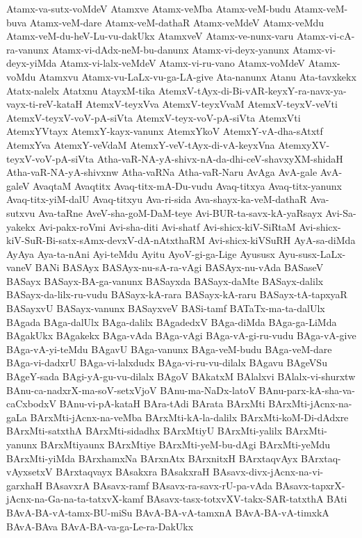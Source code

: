 {Atamx-va-sutx-voMdeV
Atamxve
Atamx-veMba
Atamx-veM-budu
Atamx-veM-buva
Atamx-veM-dare
Atamx-veM-dathaR
Atamx-veMdeV
Atamx-veMdu
Atamx-veM-du-heV-Lu-vu-dakUkx
AtamxveV
Atamx-ve-nunx-varu
Atamx-vi-cA-ra-vanunx
Atamx-vi-dAdx-neM-bu-danunx
Atamx-vi-deyx-yanunx
Atamx-vi-deyx-yiMda
Atamx-vi-lalx-veMdeV
Atamx-vi-ru-vano
Atamx-voMdeV
Atamx-voMdu
Atamxvu
Atamx-vu-LaLx-vu-ga-LA-give
Ata-nanunx
Atanu
Ata-tavxkekx
Atatx-nalelx
Atatxnu
AtayxM-tika
AtemxV-tAyx-di-Bi-vAR-keyxY-ra-navx-ya-vayx-ti-reV-kataH
AtemxV-teyxVva
AtemxV-teyxVvaM
AtemxV-teyxV-veVti
AtemxV-teyxV-voV-pA-siVta
AtemxV-teyx-voV-pA-siVta
AtemxVti
AtemxYVtayx
AtemxY-kayx-vanunx
AtemxYkoV
AtemxY-vA-dha-sAtxtf
AtemxYva
AtemxY-veVdaM
AtemxY-veV-tAyx-di-vA-keyxVna
AtemxyXV-teyxV-voV-pA-siVta
Atha-vaR-NA-yA-shivx-nA-da-dhi-ceV-shavxyXM-shidaH
Atha-vaR-NA-yA-shivxnw
Atha-vaRNa
Atha-vaR-Naru
AvAga
AvA-gale
AvA-galeV
AvaqtaM
Avaqtitx
Avaq-titx-mA-Du-vudu
Avaq-titxya
Avaq-titx-yanunx
Avaq-titx-yiM-dalU
Avaq-titxyu
Ava-ri-sida
Ava-shayx-ka-veM-dathaR
Ava-sutxvu
Ava-taRne
AveV-sha-goM-DaM-teye
Avi-BUR-ta-savx-kA-yaRsayx
Avi-Sa-yakekx
Avi-pakx-roVmi
Avi-sha-diti
Avi-shatf
Avi-shicx-kiV-SiRtaM
Avi-shicx-kiV-SuR-Bi-satx-sAmx-devxV-dA-nAtxthaRM
Avi-shicx-kiVSuRH
AyA-sa-diMda
AyAya
Aya-ta-nAni
Ayi-teMdu
Ayitu
AyoV-gi-ga-Lige
Ayususx
Ayu-susx-LaLx-vaneV
BANi
BASAyx
BASAyx-nu-sA-ra-vAgi
BASAyx-nu-vAda
BASaseV
BASayx
BASayx-BA-ga-vanunx
BASayxda
BASayx-daMte
BASayx-dalilx
BASayx-da-lilx-ru-vudu
BASayx-kA-rara
BASayx-kA-raru
BASayx-tA-tapxyaR
BASayxvU
BASayx-vanunx
BASayxveV
BASi-tamf
BATaTx-ma-ta-dalUlx
BAgada
BAga-dalUlx
BAga-dalilx
BAgadedxV
BAga-diMda
BAga-ga-LiMda
BAgakUkx
BAgakekx
BAga-vAda
BAga-vAgi
BAga-vA-gi-ru-vudu
BAga-vA-give
BAga-vA-yi-teMdu
BAgavU
BAga-vanunx
BAga-veM-budu
BAga-veM-dare
BAga-vi-dadxrU
BAga-vi-lalxdudx
BAga-vi-ru-vu-dilalx
BAgavu
BAgeVSu
BAgeY-sada
BAgi-yA-gu-vu-dilalx
BAgoV
BAkatxM
BAlalxvi
BAlalx-vi-shurxtw
BAnu-ca-nadxrX-ma-soV-setxVjoV
BAnu-ma-NaDx-latoV
BAnu-parx-kA-sha-va-caCxbodxV
BAnu-vi-pA-kataH
BAra-tAdi
BArata
BArxMti
BArxMti-jAcnx-na-gaLa
BArxMti-jAcnx-na-veMba
BArxMti-kA-la-dalilx
BArxMti-koM-Di-dAdxre
BArxMti-satxthA
BArxMti-sidadhx
BArxMtiyU
BArxMti-yalilx
BArxMti-yanunx
BArxMtiyaunx
BArxMtiye
BArxMti-yeM-bu-dAgi
BArxMti-yeMdu
BArxMti-yiMda
BArxhamxNa
BArxnAtx
BArxnitxH
BArxtaqvAyx
BArxtaq-vAyxsetxV
BArxtaqvayx
BAsakxra
BAsakxraH
BAsavx-divx-jAcnx-na-vi-garxhaH
BAsavxrA
BAsavx-ramf
BAsavx-ra-savx-rU-pa-vAda
BAsavx-tapxrX-jAcnx-na-Ga-na-ta-tatxvX-kamf
BAsavx-tasx-totxvXV-takx-SAR-tatxthA
BAti
BAvA-BA-vA-tamx-BU-miSu
BAvA-BA-vA-tamxnA
BAvA-BA-vA-timxkA
BAvA-BAva
BAvA-BA-va-ga-Le-ra-DakUkx
}
